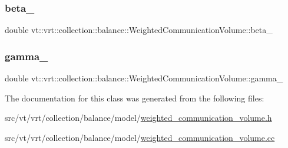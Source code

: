 \subsubsection{\texorpdfstring{beta\+\_\+}{beta\_}}
{\footnotesize\ttfamily double vt\+::vrt\+::collection\+::balance\+::\+Weighted\+Communication\+Volume\+::beta\+\_\+\hspace{0.3cm}{\ttfamily [private]}}

\mbox{\label{classvt_1_1vrt_1_1collection_1_1balance_1_1_weighted_communication_volume_abf2c523db00b66871e4583c48d472f40}} 
\subsubsection{\texorpdfstring{gamma\+\_\+}{gamma\_}}
{\footnotesize\ttfamily double vt\+::vrt\+::collection\+::balance\+::\+Weighted\+Communication\+Volume\+::gamma\+\_\+\hspace{0.3cm}{\ttfamily [private]}}



The documentation for this class was generated from the following files\+:\begin{DoxyCompactItemize}
\item 
src/vt/vrt/collection/balance/model/\hyperlink{weighted__communication__volume_8h}{weighted\+\_\+communication\+\_\+volume.\+h}\item 
src/vt/vrt/collection/balance/model/\hyperlink{weighted__communication__volume_8cc}{weighted\+\_\+communication\+\_\+volume.\+cc}\end{DoxyCompactItemize}
